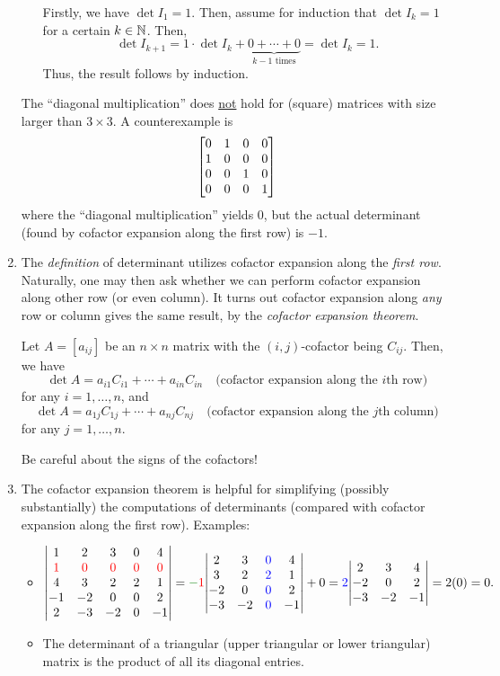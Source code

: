 \begin{enumerate}
\begin{itemize}
\begin{pf}
Firstly, we have \(\det I_1=1\). Then, assume for induction that \(\det I_k=1\)
for a certain \(k\in\mathbb{N}\). Then,
\[
\det I_{k+1}=1\cdot \det I_k+\underbrace{0+\dotsb+0}_{\text{\(k-1\) times}}
=\det I_k=1.
\]
Thus, the result follows by induction.
\end{pf}
\end{itemize}
\begin{warning}
The ``diagonal multiplication'' does \underline{not} hold for (square) matrices
with size larger than \(3\times  3\). A counterexample is
\[
\mqty[0&1&0&0\\ 1&0&0&0\\ 0&0&1&0\\ 0&0&0&1]
\]
where the ``diagonal multiplication'' yields \(0\), but the actual determinant
(found by cofactor expansion along the first row) is \(-1\).
\end{warning}
\item The \emph{definition} of determinant utilizes cofactor expansion along
the \emph{first row}. Naturally, one may then ask whether we can perform
cofactor expansion along other row (or even column). It turns out cofactor
expansion along \emph{any} row or column gives the same result, by the
\emph{cofactor expansion theorem}.

\begin{theorem}
\label{thm:cofactor-expansion}
Let \(A=[a_{ij}]\) be an \(n\times n\) matrix with the \((i,j)\)-cofactor being
\(C_{ij}\). Then, we have
\[
\det A=a_{i1}C_{i1}+\dotsb+a_{in}C_{in}\quad\text{(cofactor expansion along the \(i\)th row)}
\]
for any \(i=1,\dotsc,n\), and
\[
\det A=a_{1j}C_{1j}+\dotsb+a_{nj}C_{nj}\quad\text{(cofactor expansion along the \(j\)th column)}
\]
for any \(j=1,\dotsc,n\).
\end{theorem}
\begin{warning}
Be careful about the signs of the cofactors!
\end{warning}

\item The cofactor expansion theorem is helpful for simplifying (possibly
substantially) the computations of determinants (compared with cofactor
expansion along the first row). Examples:
\begin{itemize}
\item \(\displaystyle 
\mqty|
1&2&3&0&4\\
\rc{1}&\rc{0}&\rc{0}&\rc{0}&\rc{0}\\
4&3&2&2&1\\
-1&-2&0&0&2\\
2&-3&-2&0&-1
|
=\gc{-}\rc{1}\mqty|
2&3&\blc{0}&4\\
3&2&\blc{2}&1\\
-2&0&\blc{0}&2\\
-3&-2&\blc{0}&-1
|+0
=
\blc{2}\mqty|
2&3&4\\
-2&0&2\\
-3&-2&-1
|
=2(0)
=0.
\)
\item The determinant of a triangular (upper triangular or lower triangular)
matrix is the product of all its diagonal entries.


\end{itemize}
\end{enumerate}
